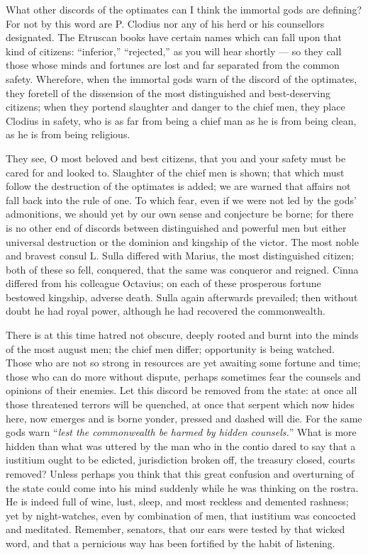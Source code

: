  What other discords of the optimates can I think the immortal gods are defining? For not by this word are P. Clodius nor any of his herd or his counsellors designated. The Etruscan books have certain names which can fall upon that kind of citizens: ``inferior,'' ``rejected,'' as you will hear shortly --- so they call those whose minds and fortunes are lost and far separated from the common safety. Wherefore, when the immortal gods warn of the discord of the optimates, they foretell of the dissension of the most distinguished and best-deserving citizens; when they portend slaughter and danger to the chief men, they place Clodius in safety, who is as far from being a chief man as he is from being clean, as he is from being religious.

 They see, O most beloved and best citizens, that you and your safety must be cared for and looked to. Slaughter of the chief men is shown; that which must follow the destruction of the optimates is added; we are warned that affairs not fall back into the rule of one. To which fear, even if we were not led by the gods' admonitions, we should yet by our own sense and conjecture be borne; for there is no other end of discords between distinguished and powerful men but either universal destruction or the dominion and kingship of the victor. The most noble and bravest consul L. Sulla differed with Marius, the most distinguished citizen; both of these so fell, conquered, that the same was conqueror and reigned. Cinna differed from his colleague Octavius; on each of these prosperous fortune bestowed kingship, adverse death. Sulla again afterwards prevailed; then without doubt he had royal power, although he had recovered the commonwealth.

 There is at this time hatred not obscure, deeply rooted and burnt into the minds of the most august men; the chief men differ; opportunity is being watched. Those who are not so strong in resources are yet awaiting some fortune and time; those who can do more without dispute, perhaps sometimes fear the counsels and opinions of their enemies. Let this discord be removed from the state: at once all those threatened terrors will be quenched, at once that serpent which now hides here, now emerges and is borne yonder, pressed and dashed will die. For the same gods warn ``\textit{lest the commonwealth be harmed by hidden counsels.}'' What is more hidden than what was uttered by the man who in the contio dared to say that a iustitium ought to be edicted, jurisdiction broken off, the treasury closed, courts removed? Unless perhaps you think that this great confusion and overturning of the state could come into his mind suddenly while he was thinking on the rostra. He is indeed full of wine, lust, sleep, and most reckless and demented rashness; yet by night-watches, even by combination of men, that iustitium was concocted and meditated. Remember, senators, that our ears were tested by that wicked word, and that a pernicious way has been fortified by the habit of listening.

